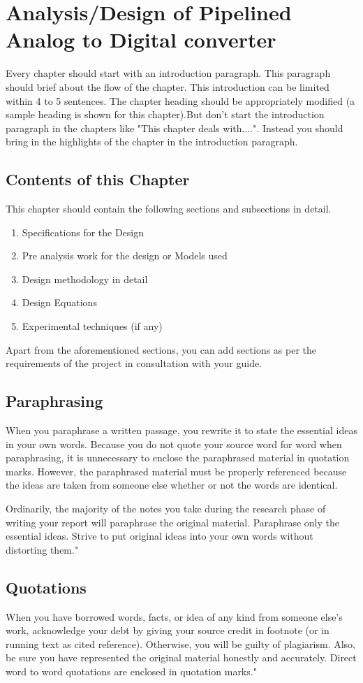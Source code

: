 \chapter{Analysis/Design of Pipelined Analog to Digital converter}

Every chapter should start with an introduction paragraph. This paragraph should brief about the flow of the chapter. This introduction can be limited within 4 to 5 sentences. The chapter heading should be appropriately modified (a sample heading is shown for this chapter).But don't start the introduction paragraph in the chapters like "This chapter deals with....". Instead you should bring in the highlights of the chapter in the introduction paragraph. 
\section{Contents of this Chapter}
This chapter should contain the following sections and subsections in detail.
\begin{enumerate}
\item Specifications for the Design
\item Pre analysis work for the design or Models used
\item Design methodology in detail
\item Design Equations
\item Experimental techniques (if any)
\end{enumerate}
Apart from the aforementioned sections, you can add sections as per the requirements of the project in consultation with your guide.

\section{Paraphrasing}
When you paraphrase a written passage, you rewrite it to state the essential ideas in your own words. Because you do not quote your source word for word when paraphrasing, it is unnecessary to enclose the paraphrased material in quotation marks. However, the paraphrased material must be properly referenced because the ideas are taken from someone else whether or not the words are identical. 

Ordinarily, the majority of the notes you take during the research phase of writing your report will paraphrase the original material. Paraphrase only the essential ideas. Strive to put original ideas into your own words without distorting them."

\section{Quotations}
When you have borrowed words, facts, or idea of any kind from someone else's work, acknowledge your debt by giving your source credit in footnote (or in running text as cited reference). Otherwise, you will be guilty of plagiarism. Also, be sure you have represented the original material honestly and accurately. Direct word to word quotations are enclosed in quotation marks."

